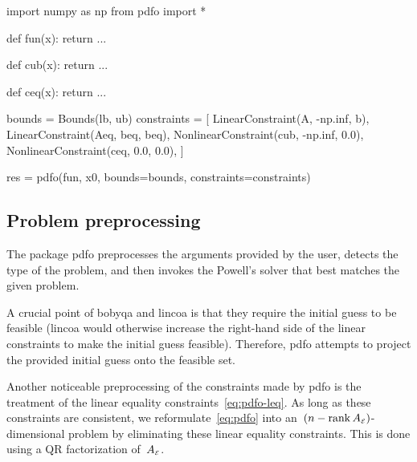 \pagebreak

\begin{lstpython}[%
    caption=An elementary example of using \gls{pdfo} in Python,
    label=lst:minimum-example-python,
]
    import numpy as np
    from pdfo import *

    def fun(x):
        return ...
    
    def cub(x):
        return ...
    
    def ceq(x):
        return ...
    
    bounds = Bounds(lb, ub)
    constraints = [
        LinearConstraint(A, -np.inf, b),
        LinearConstraint(Aeq, beq, beq),
        NonlinearConstraint(cub, -np.inf, 0.0),
        NonlinearConstraint(ceq, 0.0, 0.0),
    ]

    res = pdfo(fun, x0, bounds=bounds, constraints=constraints)
\end{lstpython}

\subsection{Problem preprocessing}
\label{subsec:pdfo-preprocessing}

The package \gls{pdfo} preprocesses the arguments provided by the user, detects the type of the problem, and then invokes the Powell's solver that best matches the given problem.

A crucial point of \gls{bobyqa} and \gls{lincoa} is that they require the initial guess to be feasible (\gls{lincoa} would otherwise increase the right-hand side of the linear constraints to make the initial guess feasible).
Therefore, \gls{pdfo} attempts to project the provided initial guess onto the feasible set.

Another noticeable preprocessing of the constraints made by \gls{pdfo} is the treatment of the linear equality constraints~\cref{eq:pdfo-leq}.
As long as these constraints are consistent, we reformulate~\cref{eq:pdfo} into an~$(n - \operatorname{rank} A_{\scriptscriptstyle\mathcal{E}})$-dimensional problem by eliminating these linear equality constraints.
This is done using a QR factorization of~$A_{\scriptscriptstyle\mathcal{E}}$.


